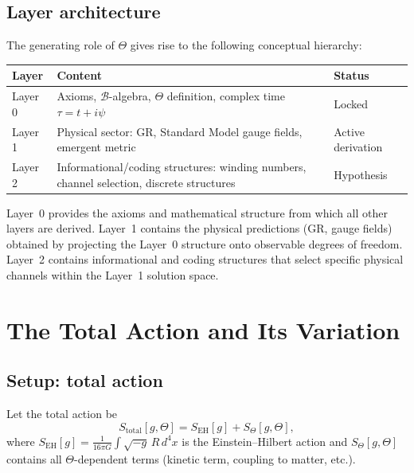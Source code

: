 \documentclass[12pt]{article}
\theoremstyle{definition}
\theoremstyle{remark}
\begin{document}
\subsection{Layer architecture}

The generating role of $\Theta$ gives rise to the following conceptual
hierarchy:

\begin{center}
\begin{tabular}{lll}
\toprule
\textbf{Layer} & \textbf{Content} & \textbf{Status} \\
\midrule
Layer 0 & Axioms, $\mathcal{B}$-algebra, $\Theta$ definition,
          complex time $\tau = t+i\psi$ & Locked \\
Layer 1 & Physical sector: GR, Standard Model gauge fields,
          emergent metric & Active derivation \\
Layer 2 & Informational/coding structures: winding numbers,
          channel selection, discrete structures & Hypothesis \\
\bottomrule
\end{tabular}
\end{center}

Layer~0 provides the axioms and mathematical structure from which all other
layers are derived.  Layer~1 contains the physical predictions (GR, gauge
fields) obtained by projecting the Layer~0 structure onto observable degrees
of freedom.  Layer~2 contains informational and coding structures that select
specific physical channels within the Layer~1 solution space.

\section{The Total Action and Its Variation}
\label{sec:action_variation}

\subsection{Setup: total action}

Let the total action be
\begin{equation}
  S_{\text{total}}[g, \Theta]
  = S_{\text{EH}}[g] + S_\Theta[g, \Theta],
  \label{eq:total_action}
\end{equation}
where $S_{\text{EH}}[g] = \frac{1}{16\pi G}\int\!\sqrt{-g}\,R\,d^4x$ is the
Einstein--Hilbert action and $S_\Theta[g,\Theta]$ contains all $\Theta$-dependent
terms (kinetic term, coupling to matter, etc.).
\end{document}
